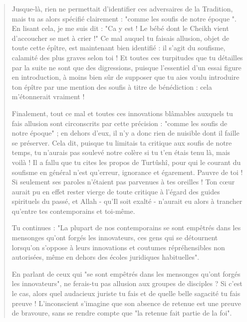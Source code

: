 \begin{quote}
Jusque-là, rien ne permettait d'identifier ces adversaires de la
Tradition, mais tu as alors spécifié clairement : "comme les soufis de
notre époque ". En lisant cela, je me suis dit : "Ca y est ! Le bébé
dont le Cheikh vient d'accoucher se met à crier !" Ce mal auquel tu
faisais allusion, objet de toute cette épître, est maintenant bien
identifié : il s'agit du soufisme, calamité des plus graves selon toi !
Et toutes ces turpitudes que tu détailles par la suite ne sont que des
digressions, puisque l'essentiel d'un essai figure en introduction, à
moins bien sûr de supposer que tu aies voulu introduire ton épître par
une mention des soufis à titre de bénédiction : cela m'étonnerait
vraiment !

Finalement, tout ce mal et toutes ces innovations blâmables auxquels tu
fais allusion sont circonscrits par cette précision : "comme les soufis
de notre époque" ; en dehors d'eux, il n'y a donc rien de nuisible dont
il faille se préserver. Cela dit, puisque tu limitais ta critique aux
soufis de notre temps, tu n'aurais pas soulevé notre colère si tu t'en
étais tenu là, mais voilà ! Il a fallu que tu cites les propos de
Turtûshî, pour qui le courant du soufisme en général n'est qu'erreur,
ignorance et égarement. Pauvre de toi ! Si seulement ses paroles
n'étaient pas parvenues à tes oreilles ! Ton cœur aurait pu en effet
rester vierge de toute critique à l'égard des guides spirituels du
passé, et Allah - qu'Il soit exalté - n'aurait eu alors à trancher
qu'entre tes contemporains et toi-même.

Tu continues : "La plupart de nos contemporains se sont empêtrés dans
les mensonges qu'ont forgés les innovateurs, ces gens qui se détournent
lorsqu'on s'oppose à leurs innovations et coutumes répréhensibles non
autorisées, même en dehors des écoles juridiques habituelles".

En parlant de ceux qui "se sont empêtrés dans les mensonges qu'ont
forgés les innovateurs", ne ferais-tu pas allusion aux groupes de
disciples ? Si c'est le cas, alors quel audacieux juriste tu fais et de
quelle belle sagacité tu fais preuve ! L'inconscient s'imagine que son
absence de retenue est une preuve de bravoure, sans se rendre compte que
"la retenue fait partie de la foi".


\end{quote}
